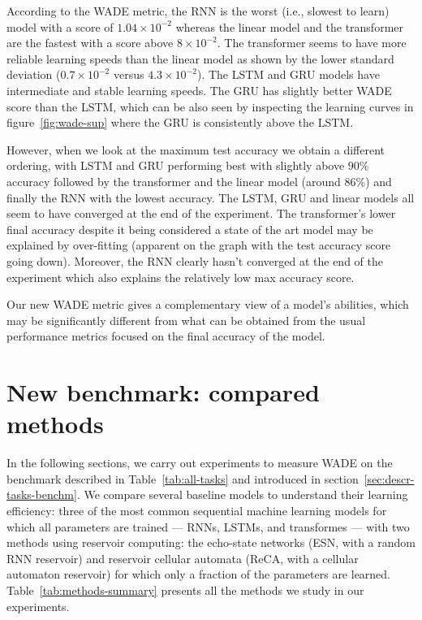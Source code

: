 According to the WADE metric, the RNN is the worst (i.e., slowest to learn) model
with a score of $1.04 \times 10^{-2}$ whereas the linear model and the transformer
are the fastest with a score above $8 \times 10^{-2}$. The transformer seems to have
more reliable learning speeds than the linear model as shown by the lower
standard deviation ($0.7\times 10 ^{-2}$ versus $4.3 \times 10^{-2}$). The LSTM and GRU
models have intermediate and stable learning speeds.
The GRU has slightly better WADE score than the LSTM, which can be also seen by inspecting the learning curves in figure~\ref{fig:wade-sup} where the GRU is consistently above the LSTM.

However, when we look at the maximum test accuracy we obtain a different ordering,
with LSTM and GRU performing best with slightly above $90\%$ accuracy followed by the
transformer and the linear model (around $86\%$) and finally the RNN with the lowest
accuracy. The LSTM, GRU and linear models all seem to have converged at the end
of the experiment. The transformer's lower final accuracy despite it being
considered a state of the art model may be explained by over-fitting (apparent
on the graph with the test accuracy score going down). Moreover, the RNN clearly
hasn't converged at the end of the experiment which also explains the relatively
low max accuracy score.

Our new WADE metric gives a complementary view of a model's abilities, which may be significantly different from what can be obtained from the usual
performance metrics focused on the final accuracy of the model.


\section{New benchmark: compared methods\label{sec:compared-methods}}

In the following sections, we carry out experiments to measure \acf{WADE} on
the benchmark described in Table~\ref{tab:all-tasks} and introduced in section~\ref{sec:descr-tasks-benchm}. We compare several
baseline models to understand their learning efficiency: three of the most common
sequential machine learning models for which all parameters are trained --- RNNs, LSTMs, and transformes --- with two methods using reservoir computing: the echo-state networks
(ESN, with a random RNN reservoir) and reservoir cellular automata (ReCA, with a
cellular automaton reservoir) for which only a fraction of the parameters are
learned. Table~\ref{tab:methods-summary} presents all the methods we study in
our experiments.

